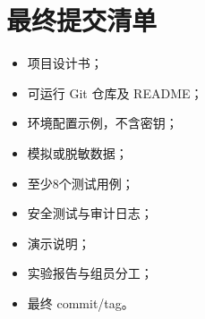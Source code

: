 \documentclass[UTF8,zihao=-4]{ctexart}
\begin{document}
\section{最终提交清单}

\begin{itemize}
  \item[$\square$] 项目设计书；
  \item[$\square$] 可运行 Git 仓库及 README；
  \item[$\square$] 环境配置示例，不含密钥；
  \item[$\square$] 模拟或脱敏数据；
  \item[$\square$] 至少8个测试用例；
  \item[$\square$] 安全测试与审计日志；
  \item[$\square$] 演示说明；
  \item[$\square$] 实验报告与组员分工；
  \item[$\square$] 最终 commit/tag。
\end{itemize}
\end{document}
